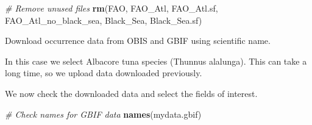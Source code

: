 \documentclass[
]{book}
\newenvironment{Shaded}{\begin{snugshade}}{\end{snugshade}}
\newcommand{\CommentTok}[1]{\textcolor[rgb]{0.56,0.35,0.01}{\textit{#1}}}
\newcommand{\FunctionTok}[1]{\textcolor[rgb]{0.13,0.29,0.53}{\textbf{#1}}}
\newcommand{\NormalTok}[1]{#1}
\newcommand{\SpecialCharTok}[1]{\textcolor[rgb]{0.81,0.36,0.00}{\textbf{#1}}}
\newcommand{\StringTok}[1]{\textcolor[rgb]{0.31,0.60,0.02}{#1}}
\begin{document}
\begin{Shaded}
\begin{Highlighting}[]
\CommentTok{\# Remove unused files}
\FunctionTok{rm}\NormalTok{(FAO, FAO\_Atl, FAO\_Atl.sf, FAO\_Atl\_no\_black\_sea, Black\_Sea, Black\_Sea.sf)}
\end{Highlighting}
\end{Shaded}

Download occurrence data from OBIS and GBIF using scientific name.

In this case we select Albacore tuna species (Thunnus alalunga). This can take a long time, so we upload data downloaded previously.

\begin{Shaded}
\end{Shaded}

We now check the downloaded data and select the fields of interest.

\begin{Shaded}
\begin{Highlighting}[]
\CommentTok{\# Check names for GBIF data}
\FunctionTok{names}\NormalTok{(mydata.gbif)}
\end{Highlighting}
\end{Shaded}
\end{document}

